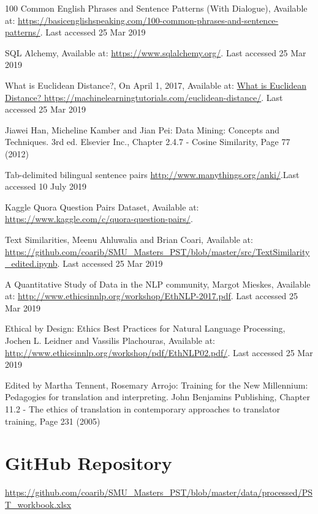 \documentclass[runningheads]{llncs}
\begin{document}
\begin{thebibliography}{8}
	100 Common English Phrases and Sentence Patterns (With Dialogue), Available at: \url{https://basicenglishspeaking.com/100-common-phrases-and-sentence-patterns/}.  Last accessed 25 Mar 2019

SQL Alchemy, Available at: \url{https://www.sqlalchemy.org/}.  Last accessed 25 Mar 2019

What is Euclidean Distance?, On April 1, 2017, Available at:  \url{What is Euclidean Distance?  https://machinelearningtutorials.com/euclidean-distance/}.  Last accessed 25 Mar 2019

Jiawei Han, Micheline Kamber and Jian Pei: Data Mining: Concepts and Techniques. 3rd ed. Elsevier Inc., Chapter 2.4.7 - Cosine Similarity, Page 77 (2012)

	Tab-delimited bilingual sentence pairs \url{http://www.manythings.org/anki/}.Last accessed  10 July 2019

Kaggle Quora Question Pairs  Dataset, Available at: 
\url{https://www.kaggle.com/c/quora-question-pairs/}.


Text Similarities, Meenu Ahluwalia and Brian Coari, Available at:  \url{https://github.com/coarib/SMU_Masters_PST/blob/master/src/TextSimilarity_edited.ipynb}.  Last accessed 25 Mar 2019
			
	A Quantitative Study of Data in the NLP community, Margot Mieskes, Available at: \url{http://www.ethicsinnlp.org/workshop/EthNLP-2017.pdf}.  Last accessed 25 Mar 2019

	Ethical by Design: Ethics Best Practices for Natural Language Processing, Jochen L. Leidner and Vassilis Plachouras, Available at: \url{http://www.ethicsinnlp.org/workshop/pdf/EthNLP02.pdf/}.  Last accessed 25 Mar 2019

	Edited by Martha Tennent, Rosemary Arrojo: Training for the New Millennium: Pedagogies for translation and interpreting. John Benjamins Publishing, Chapter 11.2 - The ethics of translation in contemporary approaches to translator training, Page 231 (2005)



\end{thebibliography}


\appendix

\section{GitHub Repository}
	\url{https://github.com/coarib/SMU_Masters_PST/blob/master/data/processed/PST_workbook.xlsx}
\end{document}
